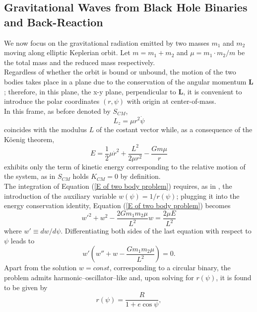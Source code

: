 \subsection{Gravitational Waves from Black Hole Binaries and Back-Reaction}
We now focus on the gravitational radiation emitted by two masses $m_1$ and $m_2$ moving along elliptic Keplerian orbit. Let $m=m_1+m_2$ and $\mu=m_1\cdot m_2/{m}$ be the total mass and the reduced mass respectively.\\Regardless of whether the orbit is bound or unbound, the motion of the two bodies takes place in a plane due to the conservation of the angular momentum $\mathbf{L}$; therefore, in this plane, the x-y plane, perpendicular to $\mathbf{L}$, it is convenient to  
introduce the polar coordinates $(r,\psi)$ with origin at center-of-mass.\\In this frame, as before denoted by $S_{CM}$, 
\begin{equation}\label{L of two body problem}
    L_z=\mu r^2\dot{\psi}
\end{equation}
coincides with the modulus $L$ of the costant vector while, as a consequence of the Köenig theorem,
\begin{equation}\label{E of two body problem}
    E=\frac{1}{2}\mu \dot{r}^2+\frac{L^2}{2\mu r^2}-\frac{Gm\mu}{r}
\end{equation}
exhibits only the term of kinetic energy corresponding to the relative motion of the system, as in $S_{CM}$ holds $K_{CM}=0$ by definition.\\The integration of Equation (\ref{E of two body problem}) requires, as in \parencite{Capozziello_2008}, the introduction of the auxiliary variable $w(\psi)=1/r(\psi)$; plugging it into the energy conservation identity, Equation (\ref{E of two body problem}) becomes 
\begin{equation}
    w'^2+w^2-\frac{2Gm_1m_2\mu}{L^2}w=\frac{2\mu E}{L^2}
\end{equation}
where $w'\equiv dw/d\psi$. Differentiating both sides of the last equation with respect to $\psi$ leads to
\begin{equation}\label{u differential equation}
    w'\left(w''+w-\frac{Gm_1m_2\mu}{L^2}\right)=0.
\end{equation}
Apart from the solution $w=const$, corresponding to a circular binary, the problem admits harmonic–oscillator–like and, upon solving for $r(\psi)$, it is found to be given by
\begin{equation}\label{two-body solution}
    r(\psi)=\frac{R}{1+e\cos{\psi}},
\end{equation}
